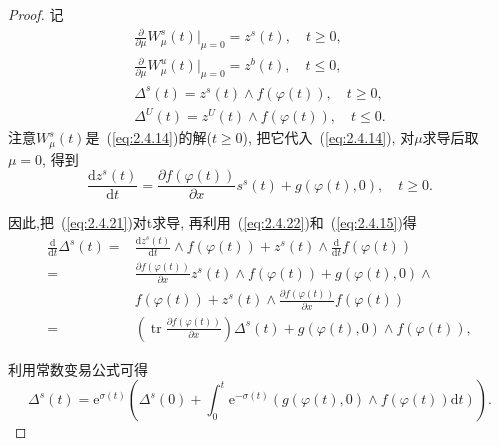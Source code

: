 \begin{proof}
  记
  \begin{align}
    \frac{\partial}{\partial \mu} W_{\mu}^{s}\left.(t)\right|_{\mu=0}=z^{s}(t), \quad t \geqslant 0,\\
    \frac{\partial}{\partial \mu} W_{\mu}^{u}\left.(t)\right|_{\mu=0}=z^{b}(t), \quad t \leqslant 0,\\
    \Delta^{s}(t)=z^{s}(t) \wedge f(\varphi(t)), \quad t \geqslant 0,\\
    \Delta^{U}(t)=z^{U}(t) \wedge f(\varphi(t)), \quad t \leqslant 0.
  \end{align}
  注意$W_{\mu}^s(t)$是~(\ref{eq:2.4.14})的解($t\geq0$),
  把它代入~(\ref{eq:2.4.14}),
  对$\mu$求导后取$\mu=0$,
  得到
  \begin{equation}
    \label{eq:2.4.22}
    \frac{\mathrm{d} z^{s}(t)}{\mathrm{d} t}=\frac{\partial f(\varphi(t))}{\partial x} s^{s}(t)+g(\varphi(t), 0), \quad t \geqslant 0.
  \end{equation}

  因此,把~(\ref{eq:2.4.21})对t求导,
  再利用~(\ref{eq:2.4.22})和~(\ref{eq:2.4.15})得
  \begin{equation*}
    \begin{aligned} \frac{\mathrm{d}}{\mathrm{d} t} \Delta^{s}(t)=& \frac{\mathrm{d} z^{s}(t)}{\mathrm{d} t} \wedge f(\varphi(t))+z^{s}(t) \wedge \frac{\mathrm{d}}{\mathrm{d} t} f(\varphi(t)) \\
      =& \frac{\partial f(\varphi(t))}{\partial x} z^{s}(t) \wedge f(\varphi(t))+g(\varphi(t), 0) \wedge \\
      & f(\varphi(t))+z^{s}(t) \wedge \frac{\partial f(\varphi(t))}{\partial x} f(\varphi(t))\\
      =&\left(\operatorname{tr} \frac{\partial f(\varphi(t))}{\partial x}\right) \Delta^{s}(t)+g(\varphi(t), 0) \wedge f(\varphi(t)),
    \end{aligned}
  \end{equation*}

  利用常数变易公式可得
  \begin{equation}
    \label{eq:2.4.23}
    \Delta^{s}(t)=\mathrm{e}^{\sigma(t)}\left(\Delta^{s}(0)+\int_{0}^{t} \mathrm{e}^{-\sigma(t)}(g(\varphi(t), 0) \wedge f(\varphi(t)) \mathrm{d} t)\right).
  \end{equation}


\end{proof}
